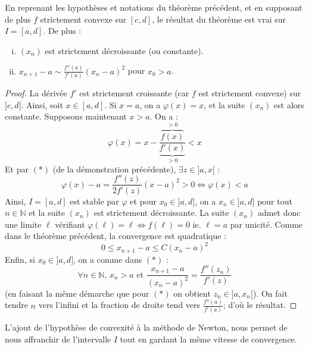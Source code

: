 	\begin{corollary}
		En reprenant les hypothèses et notations du théorème précédent, et en supposant de plus $f$ strictement convexe sur $[c, d]$, le résultat du théorème est vrai sur $I = [a, d]$. De plus :
		\begin{enumerate}[(i)]
			\item $(x_n)$ est strictement décroissante (ou constante).
			\item $x_{n+1} - a \sim \frac{f''(a)}{f'(a)} (x_n - a)^2$ pour $x_0 > a$.
		\end{enumerate}
	\end{corollary}

	\begin{proof}
		La dérivée $f'$ est strictement croissante (car $f$ est strictement convexe) sur $]c, d[$. Ainsi, soit $x \in [a, d]$. Si $x = a$, on a $\varphi(x) = x$, et la suite $(x_n)$ est alors constante. Supposons maintenant $x > a$. On a :
		\[ \varphi(x) = x - \frac{\overbrace{f(x)}^{> 0}}{\underbrace{f'(x)}_{> 0}} < x \]
		Et par $(*)$ (de la démonstration précédente), $\exists z \in ]a, x[$ :
		\[ \varphi(x) - a = \frac{f''(z)}{2f'(z)} (x-a)^2 > 0 \iff \varphi(x) < a \]
		Ainsi, $I = [a, d]$ est stable par $\varphi$ et pour $x_0 \in ]a, d]$, on a $x_n \in ]a, d]$ pour tout $n \in \mathbb{N}$ et la suite $(x_n)$ est strictement décroissante. La suite $(x_n)$ admet donc une limite $\ell$ vérifiant $\varphi(\ell) = \ell \iff f(\ell) = 0$ ie. $\ell = a$ par unicité. Comme dans le théorème précédent, la convergence est quadratique :
		\[ 0 \leq x_{n+1} - a \leq C (x_n - a)^2 \]
		Enfin, si $x_0 \in ]a, d]$, on a comme dans $(*)$ :
		\[ \forall n \in \mathbb{N}, \, x_n > a \text{ et } \frac{x_{n+1} - a}{(x_n - a)^2} = \frac{f''(z_n)}{f'(z)} \]
		(en faisant la même démarche que pour $(*)$ on obtient $z_n \in ]a, x_n[$). On fait tendre $n$ vers l'infini et la fraction de droite tend vers $\frac{f''(a)}{f'(a)}$; d'où le résultat.
	\end{proof}

	\begin{remark}
		L'ajout de l'hypothèse de convexité à la méthode de Newton, nous permet de nous affranchir de l'intervalle $I$ tout en gardant la même vitesse de convergence.
	\end{remark}

